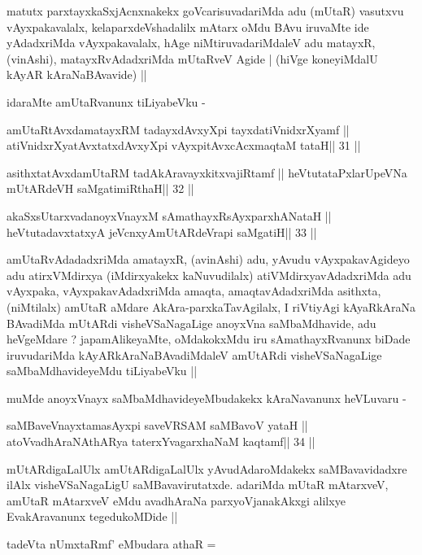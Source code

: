 \begin{artha}
matutx parxtayxkaSxjAcnxnakekx goVcarisuvadariMda adu (mUtaR) vasutxvu
vAyxpakavalalx, kelaparxdeVshadalilx mAtarx oMdu BAvu iruvaMte ide
yAdadxriMda vAyxpakavalalx, hAge niMtiruvadariMdaleV adu matayxR,
(vinAshi), matayxRvAdadxriMda mUtaRveV Agide | (hiVge koneyiMdalU
kAyAR kAraNaBAvavide) ||

idaraMte amUtaRvanunx tiLiyabeVku -
\end{artha}

\begin{shl}
amUtaRtAvxdamatayxRM tadayxdAvxyXpi tayxdatiVnidxrXyamf ||
atiVnidxrXyatAvxtatxdAvxyXpi vAyxpitAvxcAcxmaqtaM tataH\hfill || 31 ||
\end{shl}

\begin{shl}
asithxtatAvxdamUtaRM tadAkAravayxkitxvajiRtamf ||
heVtutataPxlarUpeVNa mUtARdeVH saMgatimiRthaH\hfill || 32 ||
\end{shl}

\begin{shl}
akaSxsUtarxvadanoyxVnayxM sAmathayxRsAyxparxhANataH ||
heVtutadavxtatxyA jeVcnxyA\s mUtARdeVrapi saMgatiH\hfill || 33 ||
\end{shl}

\begin{artha}
amUtaRvAdadadxriMda amatayxR, (avinAshi) adu, yAvudu vAyxpakavAgideyo
adu atirxVMdirxya (iMdirxyakekx kaNuvudilalx) atiVMdirxyavAdadxriMda
adu vAyxpaka, vAyxpakavAdadxriMda amaqta, amaqtavAdadxriMda asithxta,
(niMtilalx) amUtaR aMdare AkAra-parxkaTavAgilalx, I riVtiyAgi
kAyaRkAraNa BAvadiMda mUtARdi visheVSaNagaLige anoyxVna saMbaMdhavide,
adu heVgeMdare ? japamAlikeyaMte, oMdakokxMdu iru sAmathayxRvanunx
biDade iruvudariMda kAyARkAraNaBAvadiMdaleV amUtARdi visheVSaNagaLige
saMbaMdhavideyeMdu tiLiyabeVku ||

muMde anoyxVnayx saMbaMdhavideyeMbudakekx kAraNavanunx heVLuvaru -
\end{artha}

\begin{shl}
saMBaveV\s nayxtamasAyxpi saveVRSAM saMBavoV yataH ||
atoV\s vadhAraNAthARya taterxYvagarxhaNaM kaqtamf\hfill || 34 ||
\end{shl}

\begin{artha}
mUtARdigaLalUlx amUtARdigaLalUlx yAvudAdaroMdakekx saMBavavidadxre
ilAlx visheVSaNagaLigU saMBavavirutatxde. adariMda mUtaR mAtarxveV,
amUtaR mAtarxveV eMdu avadhAraNa parxyoVjanakAkxgi alilxye
EvakAravanunx tegedukoMDide ||

tadeVta nUmxtaRmf' eMbudara athaR =
\end{artha}

